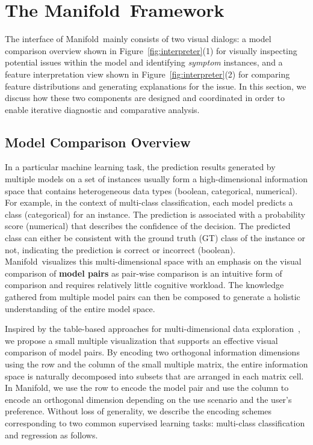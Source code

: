 \documentclass[preprint,journal]{vgtc}       %
\newcommand{\techname}{Manifold}
\begin{document}
\section{The \techname\ Framework}
The interface of \techname\ mainly consists of two visual dialogs: a model comparison overview shown in Figure~\ref{fig:interpreter}(1) for visually inspecting potential issues within the model and identifying \textit{symptom} instances, and a feature interpretation view shown in Figure~\ref{fig:interpreter}(2) for comparing feature distributions and generating explanations for the issue. In this section, we discuss how these two components are designed and coordinated in order to enable iterative diagnostic and comparative analysis.

\subsection{Model Comparison Overview}
In a particular machine learning task, the prediction results generated by multiple models on a set of instances usually form a high-dimensional information space that contains heterogeneous data types (boolean, categorical, numerical). For example, in the context of multi-class classification, each model predicts a class (categorical) for an instance. The prediction is associated with a probability score (numerical) that describes the confidence of the decision. The predicted class can either be consistent with the ground truth (GT) class of the instance or not, indicating the prediction is correct or incorrect (boolean). \techname\ visualizes this multi-dimensional space with an emphasis on the visual comparison of \textbf{model pairs} as pair-wise comparison is an intuitive form of comparison and requires relatively little cognitive workload. The knowledge gathered from multiple model pairs can then be composed to generate a holistic understanding of the entire model space.

Inspired by the table-based approaches for multi-dimensional data exploration~\cite{stolte2002polaris}, we propose a small multiple visualization that supports an effective visual comparison of model pairs. By encoding two orthogonal information dimensions using the row and the column of the small multiple matrix, the entire information space is naturally decomposed into subsets that are arranged in each matrix cell. In \techname, we use the row to encode the model pair and use the column to encode an orthogonal dimension depending on the use scenario and the user's preference. Without loss of generality, we describe the encoding schemes corresponding to two common supervised learning tasks: multi-class classification and regression as follows.
\end{document}
